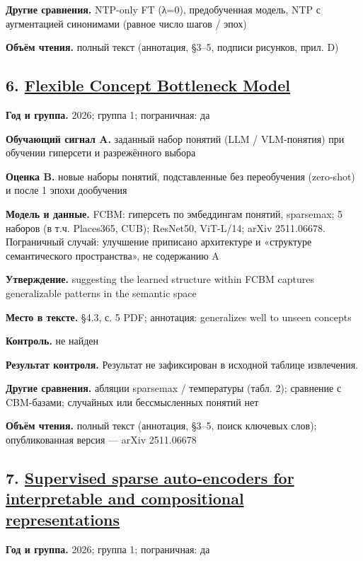\textbf{Другие сравнения.} NTP-only FT (λ=0), предобученная модель, NTP с аугментацией синонимами (равное число шагов / эпох)

\textbf{Объём чтения.} полный текст (аннотация, §3–5, подписи рисунков, прил. D)


\subsection*{6. \href{https://doi.org/10.48448/tzyh-b804}{Flexible Concept Bottleneck Model}}

\textbf{Год и группа.} 2026; группа 1; пограничная: да

\textbf{Обучающий сигнал A.} заданный набор понятий (LLM / VLM-понятия) при обучении гиперсети и разрежённого выбора

\textbf{Оценка B.} новые наборы понятий, подставленные без переобучения (zero-shot) и после 1 эпохи дообучения

\textbf{Модель и данные.} FCBM: гиперсеть по эмбеддингам понятий, sparsemax; 5 наборов (в т.ч. Places365, CUB); ResNet50, ViT-L/14; arXiv 2511.06678. Пограничный случай: улучшение приписано архитектуре и «структуре семантического пространства», не содержанию A

\textbf{Утверждение.} suggesting the learned structure within FCBM captures generalizable patterns in the semantic space

\textbf{Место в тексте.} §4.3, с. 5 PDF; аннотация: generalizes well to unseen concepts

\textbf{Контроль.} не найден

\textbf{Результат контроля.} Результат не зафиксирован в исходной таблице извлечения.

\textbf{Другие сравнения.} абляции sparsemax / температуры (табл. 2); сравнение с CBM-базами; случайных или бессмысленных понятий нет

\textbf{Объём чтения.} полный текст (аннотация, §3–5, поиск ключевых слов); опубликованная версия — arXiv 2511.06678


\subsection*{7. \href{https://doi.org/10.48550/arxiv.2602.00924}{Supervised sparse auto-encoders for interpretable and compositional representations}}

\textbf{Год и группа.} 2026; группа 1; пограничная: да

